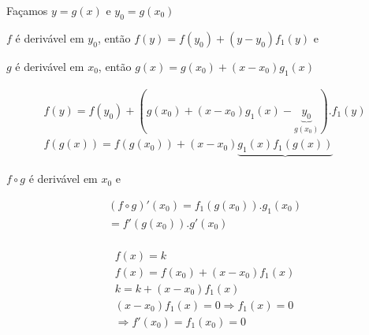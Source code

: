 \documentclass[11pt, oneside, a4paper]{gsm-l}
\begin{document}
\begin{dem}

Façamos $y = g\left( x \right)$ e $y_0 = g\left( {x_0 } \right)$

$f$ é derivável em $y_0 $, então $f\left( y \right) = f\left( {y_0
} \right) + \left( {y - y_0 } \right)f_1 \left( y \right)$ e

$g$ é derivável em $x_0 $, então $g\left( x \right) = g\left( {x_0
} \right) + \left( {x - x_0 } \right)g_1 \left( x \right)$

\begin{eqnarray*}
f\left( y \right) = f\left( {y_0 } \right) + \left( {g\left( {x_0 } \right)
+ \left( {x - x_0 } \right)g_1 \left( x \right) - \underbrace {y_0
}_{g\left( {x_0 } \right)}} \right).f_1 \left( y \right) \\
f\left( {g\left( x \right)} \right) = f\left( {g\left( {x_0 } \right)}
\right) + \left( {x - x_0 } \right)\underbrace {g_1 \left( x \right)f_1
\left( {g\left( x \right)} \right)}
\end{eqnarray*}

$f \circ g$ é derivável em $x_0 $ e

\[
\begin{array}{l}
\left( {f \circ g} \right)'\left( {x_0 } \right) = f_1 \left( {g\left( {x_0
} \right)} \right).g_1 \left( {x_0 } \right) \\
= f'\left( {g\left( {x_0 } \right)} \right).g'\left( {x_0 } \right) \\
\end{array}
\]

\end{dem}

\begin{exem}

\[
\begin{array}{l}
f\left( x \right) = k \\
f\left( x \right) = f\left( {x_0 } \right) + \left( {x - x_0 } \right)f_1
\left( x \right) \\
k = k + \left( {x - x_0 } \right)f_1 \left( x \right) \\
\left( {x - x_0 } \right)f_1 \left( x \right) = 0 \Rightarrow f_1 \left( x
\right) = 0 \\
\Rightarrow f'\left( {x_0 } \right) = f_1 \left( {x_0 } \right) = 0 \\
\end{array}
\]

\end{exem}
\end{document}
